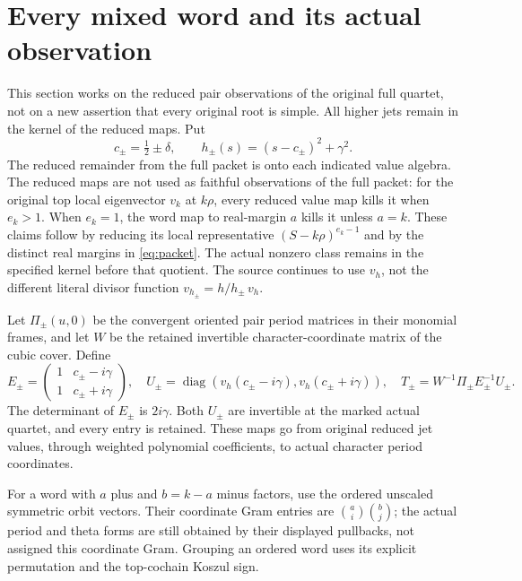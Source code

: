 \documentclass[11pt,a4paper]{article}
\newcommand{\diag}{\operatorname{diag}}
\begin{document}
\section{Every mixed word and its actual observation}\label{sec:rank}
This section works on the reduced pair observations of the original full quartet, not on a new assertion that every original root is simple. All higher jets remain in the kernel of the reduced maps. Put
\begin{equation}
 c_\pm=\tfrac12\pm\delta,\qquad
 h_\pm(s)=(s-c_\pm)^2+\gamma^2.
\end{equation}
The reduced remainder from the full packet is onto each indicated value algebra. The reduced maps are not used as faithful observations of the full packet: for the original top local eigenvector $v_k$ at $k\rho$, every reduced value map kills it when $e_k>1$. When $e_k=1$, the word map to real-margin $a$ kills it unless $a=k$. These claims follow by reducing its local representative $(S-k\rho)^{e_k-1}$ and by the distinct real margins in \eqref{eq:packet}. The actual nonzero class remains in the specified kernel before that quotient. The source continues to use $v_h$, not the different literal divisor function $v_{h_\pm}=h/h_\pm\,v_h$.

Let $\Pi_\pm(u,0)$ be the convergent oriented pair period matrices in their monomial frames, and let $W$ be the retained invertible character-coordinate matrix of the cubic cover. Define
\begin{equation}
 E_\pm=\begin{pmatrix}1&c_\pm-i\gamma\\1&c_\pm+i\gamma\end{pmatrix},\quad
 U_\pm=\diag(v_h(c_\pm-i\gamma),v_h(c_\pm+i\gamma)),\quad
 T_\pm=W^{-1}\Pi_\pm E_\pm^{-1}U_\pm.
 \label{eq:pairmaps}
\end{equation}
The determinant of $E_\pm$ is $2i\gamma$. Both $U_\pm$ are invertible at the marked actual quartet, and every entry is retained. These maps go from original reduced jet values, through weighted polynomial coefficients, to actual character period coordinates.

For a word with $a$ plus and $b=k-a$ minus factors, use the ordered unscaled symmetric orbit vectors. Their coordinate Gram entries are
$\binom ai\binom bj$; the actual period and theta forms are still obtained by their displayed pullbacks, not assigned this coordinate Gram. Grouping an ordered word uses its explicit permutation and the top-cochain Koszul sign.
\end{document}

